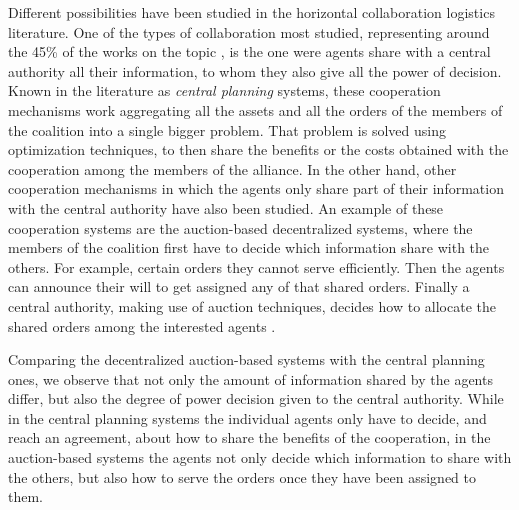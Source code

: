 \documentclass{article}
\begin{document}
Different possibilities have been studied in the horizontal collaboration logistics literature. One of the types of collaboration most studied, representing around the 45\% of the works on the topic \parencite{GANTERER2017}, is the one were agents share with a central authority all their information, to whom they also give all the power of decision. Known in the literature as \emph{central planning} systems, these cooperation mechanisms work aggregating all the assets and all the orders of the members of the coalition into a single bigger problem. That problem is solved using optimization techniques, to then share the benefits or the costs obtained with the cooperation among the members of the alliance. In the other hand, other cooperation mechanisms in which the agents only share part of their information with the central authority have also been studied. An example of these cooperation systems are the auction-based decentralized systems, where the members of the coalition first have to decide which information share with the others. For example, certain orders they cannot serve efficiently. Then the agents can announce their will to get assigned any of that shared orders. Finally a central authority, making use of auction techniques, decides how to allocate the shared orders among the interested agents \parencite{VERDONCK2013}. 

Comparing the decentralized auction-based systems with the central planning ones, we observe that not only the amount of information shared by the agents differ, but also the degree of power decision given to the central authority. While in the central planning systems the individual agents only have to decide, and reach an agreement, about how to share the benefits of the cooperation, in the auction-based systems the agents not only decide which information to share with the others, but also how to serve the orders once they have been assigned to them. 
\end{document}
